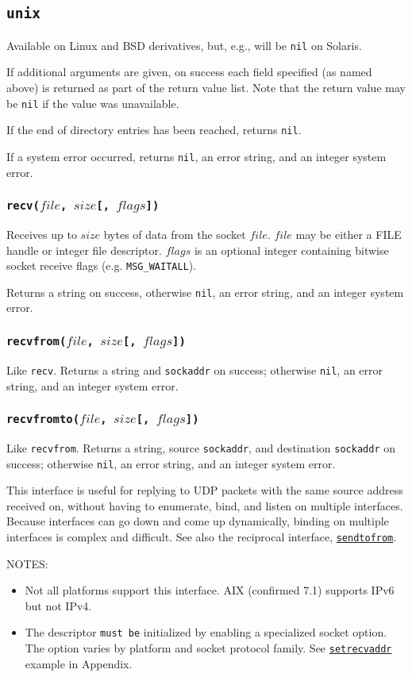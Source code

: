 \documentclass[11pt, oneside]{memoir}
\newcommand*{\nil}[0]{\texttt{nil}\xspace}
\newcommand*{\syscall}[1]{\texttt{#1}\xspace}
\newcommand*{\fn}[1]{\texttt{#1}\xspace}
\newcommand*{\otherwise}[1]{otherwise #1, an error string, and an integer system error}
\newcommand*{\sockaddr}[0]{\texttt{sockaddr}\xspace}
\newcommand*{\mustbe}[0]{\texttt{must be}\xspace}
\newcommand*{\seefn}[1]{\hyperref[#1]{\fn{#1}}\xspace}
\newcounter{toccols}
\newenvironment{Module}[1]{
	\subsection{\texttt{#1}}
	\addtocontents{toc}{
		\protect\begin{multicols}{\value{toccols}}
	}
}{
	\addtocontents{toc}{\protect\end{multicols}}
}
\begin{document}
\begin{Module}{unix}
\begin{description}
Available on Linux and BSD derivatives, but, e.g., will be \nil on Solaris.
\end{description}

If additional arguments are given, on success each field specified (as named above) is returned as part of the return value list. Note that the return value may be \nil if the value was unavailable.

If the end of directory entries has been reached, returns \nil.

If a system error occurred, returns \nil, an error string, and an integer system error.

\subsubsection[\fn{recv}]{\fn{recv($file$, $size$[, $flags$])}}

Receives up to $size$ bytes of data from the socket $file$. $file$ may be either a FILE handle or integer file descriptor. $flags$ is an optional integer containing bitwise socket receive flags (e.g. \texttt{MSG\_WAITALL}).

Returns a string on success, \otherwise{\nil}.

\subsubsection[\fn{recvfrom}]{\fn{recvfrom($file$, $size$[, $flags$])}}

Like \syscall{recv}. Returns a string and \sockaddr on success; \otherwise{\nil}.

\subsubsection[\fn{recvfromto}]{\fn{recvfromto($file$, $size$[, $flags$])}}

\label{recvfromto}

Like \syscall{recvfrom}. Returns a string, source \sockaddr, and destination \sockaddr on success; \otherwise{\nil}.

This interface is useful for replying to UDP packets with the same source address received on, without having to enumerate, bind, and listen on multiple interfaces. Because interfaces can go down and come up dynamically, binding on multiple interfaces is complex and difficult. See also the reciprocal interface, \seefn{sendtofrom}.

NOTES:
\begin{itemize}
\item Not all platforms support this interface. AIX (confirmed 7.1) supports IPv6 but not IPv4.
\item The descriptor \mustbe initialized by enabling a specialized socket option. The option varies by platform and socket protocol family. See \seefn{setrecvaddr} example in Appendix.
\end{itemize}


\end{Module}
\end{document}
